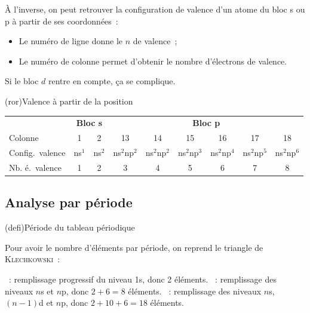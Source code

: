 \documentclass[../../main/main.tex]{subfiles}
\begin{document}
À l'inverse, on peut retrouver la configuration de valence d'un atome du bloc s
ou p à partir de ses coordonnées~:
\begin{itemize}
	\item Le numéro de ligne donne le $n$ de valence~;
	\item Le numéro de colonne permet d'obtenir le nombre d'électrons de
	      valence.
\end{itemize}
Si le bloc $d$ rentre en compte, ça se complique.

\begin{tcb*}(ror){Valence à partir de la position}
	\begin{center}
		\label{tab:valsp}
		\begin{tabular}{lcccccccc}
			\toprule
			                                    &
			\multicolumn{2}{c}{\textbf{Bloc s}} &
			\multicolumn{6}{c}{\textbf{Bloc p}}
			\\ \cmidrule(lr){2-3} \cmidrule(lr){4-9}
			Colonne                             & 1      & 2      & 13           & 14           & 15           & 16           & 17           & 18
			\\\midrule
			Config.\ valence                    & ns$^1$ & ns$^2$ & ns$^2$np$^2$ & ns$^2$np$^2$ & ns$^2$np$^3$ & ns$^2$np$^4$ & ns$^2$np$^5$ & ns$^2$np$^6$
			\\\midrule
			Nb. é.\ valence                     & 1      & 2      & 3            & 4            & 5            & 6            & 7            & 8
			\\\bottomrule
		\end{tabular}
	\end{center}
\end{tcb*}


\subsection{Analyse par période}
\begin{tcb*}(defi){Période du tableau périodique}
\end{tcb*}

Pour avoir le nombre d'éléments par période, on reprend le triangle de
\textsc{Klechkowski}~:
\begin{itemize}
	~: remplissage progressif du niveau 1s, donc 2 éléments.
	~: remplissage des niveaux $n$s et $n$p, donc $2+6=8$
	éléments.
	~: remplissage des niveaux $n$s, $(n-1)$d et $n$p, donc
	$2+10+6=18$ éléments.
\end{itemize}
\end{document}
